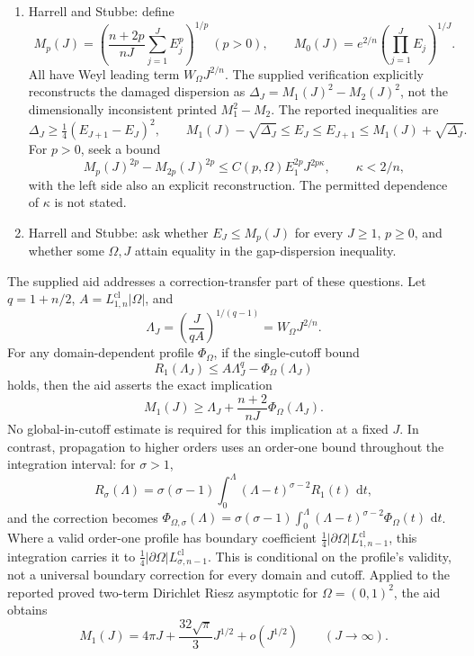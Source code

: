 \documentclass[11pt]{article}
\newcommand{\dd}{\,\mathrm{d}}
\begin{document}
\begin{enumerate}
\item Harrell and Stubbe: define
\[
 M_p(J)=\left(\frac{n+2p}{nJ}\sum_{j=1}^JE_j^p\right)^{1/p}\ (p>0),\qquad
 M_0(J)=e^{2/n}\left(\prod_{j=1}^JE_j\right)^{1/J}.
\]
All have Weyl leading term \(W_\Omega J^{2/n}\). The supplied verification explicitly reconstructs the damaged dispersion as \(\Delta_J=M_1(J)^2-M_2(J)^2\), not the dimensionally inconsistent printed \(M_1^2-M_2\). The reported inequalities are
\[
 \Delta_J\geq\tfrac14(E_{J+1}-E_J)^2,\qquad
 M_1(J)-\sqrt{\Delta_J}\leq E_J\leq E_{J+1}\leq M_1(J)+\sqrt{\Delta_J}.
\]
For \(p>0\), seek a bound
\[
 M_p(J)^{2p}-M_{2p}(J)^{2p}
 \leq C(p,\Omega)E_1^{2p}J^{2p\kappa},\qquad\kappa<2/n,
\]
with the left side also an explicit reconstruction. The permitted dependence of \(\kappa\) is not stated.
\item Harrell and Stubbe: ask whether \(E_J\leq M_p(J)\) for every \(J\geq1\), \(p\geq0\), and whether some \(\Omega,J\) attain equality in the gap-dispersion inequality.
\end{enumerate}

The supplied aid addresses a correction-transfer part of these questions. Let \(q=1+n/2\), \(A=L_{1,n}^{\mathrm{cl}}|\Omega|\), and
\[
 \Lambda_J=\left(\frac{J}{qA}\right)^{1/(q-1)}=W_\Omega J^{2/n}.
\]
For any domain-dependent profile \(\Phi_\Omega\), if the single-cutoff bound
\[
 R_1(\Lambda_J)\leq A\Lambda_J^q-\Phi_\Omega(\Lambda_J)
\]
holds, then the aid asserts the exact implication
\[
 M_1(J)\geq\Lambda_J+\frac{n+2}{nJ}\Phi_\Omega(\Lambda_J).
\]
No global-in-cutoff estimate is required for this implication at a fixed \(J\). In contrast, propagation to higher orders uses an order-one bound throughout the integration interval: for \(\sigma>1\),
\[
 R_\sigma(\Lambda)=\sigma(\sigma-1)\int_0^\Lambda(\Lambda-t)^{\sigma-2}R_1(t)\,\dd t,
\]
and the correction becomes \(\Phi_{\Omega,\sigma}(\Lambda)=\sigma(\sigma-1)\int_0^\Lambda(\Lambda-t)^{\sigma-2}\Phi_\Omega(t)\,\dd t\). Where a valid order-one profile has boundary coefficient \(\tfrac14|\partial\Omega|L_{1,n-1}^{\mathrm{cl}}\), this integration carries it to \(\tfrac14|\partial\Omega|L_{\sigma,n-1}^{\mathrm{cl}}\). This is conditional on the profile's validity, not a universal boundary correction for every domain and cutoff. Applied to the reported proved two-term Dirichlet Riesz asymptotic for \(\Omega=(0,1)^2\), the aid obtains
\[
 M_1(J)=4\pi J+\frac{32\sqrt\pi}{3}J^{1/2}+o(J^{1/2})\qquad(J\to\infty).
\]
\end{document}
